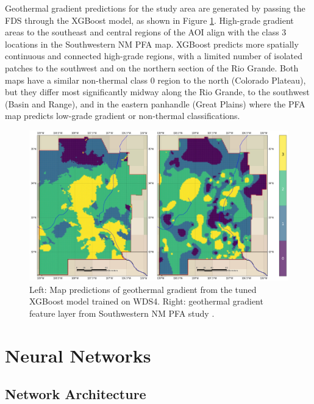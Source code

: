 Geothermal gradient predictions for the study area are generated by passing the FDS through the XGBoost model, as shown in Figure \ref{fig:xgb_final_map}. High-grade gradient areas to the southeast and central regions of the AOI align with the class 3 locations in the \citet{bielicki_hydrogeolgic_2015} Southwestern NM PFA map. XGBoost predicts more spatially continuous and connected high-grade regions, with a limited number of isolated patches to the southwest and on the northern section of the Rio Grande. Both maps have a similar non-thermal class 0 region to the north (Colorado Plateau), but they differ most significantly midway along the Rio Grande, to the southwest (Basin and Range), and in the eastern panhandle (Great Plains) where the PFA map predicts low-grade gradient or non-thermal classifications.

\begin{figure}[!htp]
\centering
\includegraphics[width=\textwidth]{templates/images/Figure-XGB-FinalMap_Joint.png}
\caption[XGBoost prediction map]{Left: Map predictions of geothermal gradient from the tuned XGBoost model trained on WDS4. Right: geothermal gradient feature layer from Southwestern NM PFA study \protect\citep{bielicki_hydrogeolgic_2015}.}
\label{fig:xgb_final_map}
\end{figure}

\section{Neural Networks}\label{ch5:ann_model}

\subsection{Network Architecture}\label{ch5:ann_structure}

